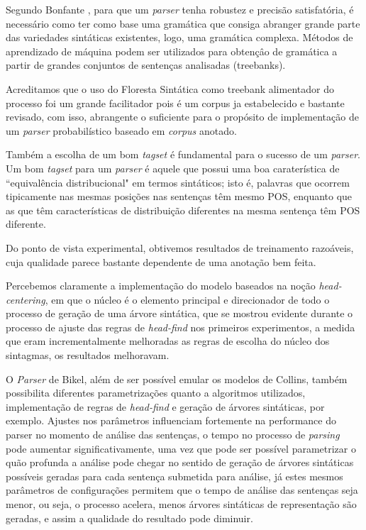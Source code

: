 Segundo Bonfante \cite{bonfante03}, para que um \emph{parser} tenha robustez e precisão satisfatória, é necessário como ter como base uma gramática que consiga abranger grande parte das variedades sintáticas existentes, logo, uma gramática complexa. Métodos de aprendizado de máquina podem ser utilizados para obtençâo de gramática a partir de grandes conjuntos de sentenças analisadas (treebanks). 

Acreditamos que o uso do Floresta Sintática como treebank alimentador do processo foi um grande facilitador pois é um corpus ja estabelecido e bastante revisado, com isso, abrangente o suficiente para o propósito de implementação de um \emph{parser} probabilístico baseado em \emph{corpus} anotado.

Também a escolha de um bom \emph{tagset} é fundamental para o sucesso de um \emph{parser}. Um bom \emph{tagset} para um \emph{parser} é aquele que possui uma boa caraterística de ``equivalência distribucional" em termos sintáticos; isto é, palavras que ocorrem tipicamente nas mesmas posições nas sentenças têm mesmo POS, enquanto que as que têm características de distribuição diferentes na mesma sentença têm POS diferente. 

Do ponto de vista experimental, obtivemos resultados de treinamento razoáveis, cuja qualidade parece bastante dependente de uma anotação bem feita. 

Percebemos claramente a implementação do modelo baseados na noção \emph{head-centering}, em que o núcleo é o elemento principal e direcionador de todo o processo de geração de uma árvore sintática, que se mostrou evidente durante o processo de ajuste das regras de \emph{head-find} nos primeiros experimentos, a medida que eram incrementalmente melhoradas as regras de escolha do núcleo dos sintagmas, os resultados melhoravam.

O \emph{Parser} de Bikel, além de ser possível emular os modelos de Collins, também possibilita diferentes parametrizações quanto a algoritmos utilizados, implementação de regras de \emph{head-find} e geração de árvores sintáticas, por exemplo. Ajustes nos parâmetros influenciam fortemente na performance do parser no momento de análise das sentenças, o tempo no processo de \emph{parsing} pode aumentar significativamente, uma vez que pode ser possível parametrizar o quão profunda a análise pode chegar no sentido de geração de árvores sintáticas possíveis geradas para cada sentença submetida para análise, já estes mesmos parâmetros de configurações permitem que o tempo de análise das sentenças seja menor, ou seja, o processo acelera, menos árvores sintáticas de representação são geradas, e assim a qualidade do resultado pode diminuir.

